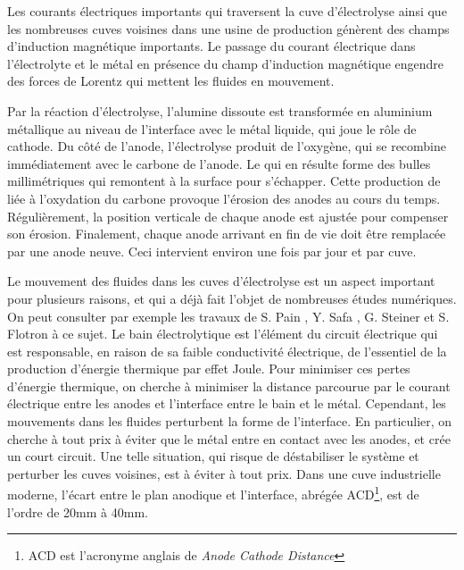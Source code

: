 Les courants électriques importants qui traversent la cuve
d'électrolyse ainsi que les nombreuses cuves voisines dans une usine
de production génèrent des champs d'induction magnétique
importants. Le passage du courant électrique dans l'électrolyte et le
métal en présence du champ d'induction magnétique engendre des forces
de Lorentz qui mettent les fluides en mouvement.

Par la réaction d'électrolyse, l'alumine dissoute est transformée en
aluminium métallique au niveau de l'interface avec le métal liquide,
qui joue le rôle de cathode. Du côté de l'anode, l'électrolyse produit
de l'oxygène, qui se recombine immédiatement avec le carbone de
l'anode. Le  qui en résulte forme des bulles millimétriques
qui remontent à la surface pour s'échapper. Cette production de
 liée à l'oxydation du carbone provoque l'érosion des anodes
au cours du temps. Régulièrement, la position verticale de chaque
anode est ajustée pour compenser son érosion. Finalement, chaque
anode arrivant en fin de vie doit être remplacée par une anode
neuve. Ceci intervient environ une fois par jour et par cuve.

Le mouvement des fluides dans les cuves d'électrolyse est un aspect
important pour plusieurs raisons, et qui a déjà fait l'objet de
nombreuses études numériques. On peut consulter par exemple les travaux de
S. Pain \cite{Pain2006}, Y. Safa \cite{Safa2009}, G. Steiner
\cite{Steiner2009} et S. Flotron \cite{Flotron2013} à ce sujet. Le bain
électrolytique est l'élément du circuit électrique qui est
responsable, en raison de sa faible conductivité électrique, de
l'essentiel de la production d'énergie thermique par effet
Joule. Pour minimiser ces pertes d'énergie thermique, on cherche à
minimiser la distance parcourue par le courant électrique entre les
anodes et l'interface entre le bain et le métal. Cependant, les
mouvements dans les fluides perturbent la forme de l'interface. En
particulier, on cherche à tout prix à éviter que le métal entre en
contact avec les anodes, et crée un court circuit. Une telle
situation, qui risque de déstabiliser le système et perturber les
cuves voisines, est à éviter à tout prix. Dans une cuve industrielle
moderne, l'écart entre le plan anodique et l'interface, abrégée
ACD\footnote{ACD est l'acronyme anglais de {\em Anode Cathode
    Distance}}, est de l'ordre de \num{20}\si{\milli\meter} à
\num{40}\si{\milli\meter}.

